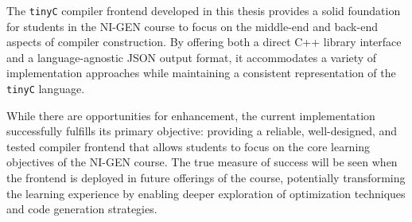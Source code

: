 The \texttt{tinyC} compiler frontend developed in this thesis provides a solid foundation for students in the NI-GEN course to focus on the middle-end and back-end aspects of compiler construction. By offering both a direct C++ library interface and a language-agnostic JSON output format, it accommodates a variety of implementation approaches while maintaining a consistent representation of the \texttt{tinyC} language.

While there are opportunities for enhancement, the current implementation successfully fulfills its primary objective: providing a reliable, well-designed, and tested compiler frontend that allows students to focus on the core learning objectives of the NI-GEN course. The true measure of success will be seen when the frontend is deployed in future offerings of the course, potentially transforming the learning experience by enabling deeper exploration of optimization techniques and code generation strategies.